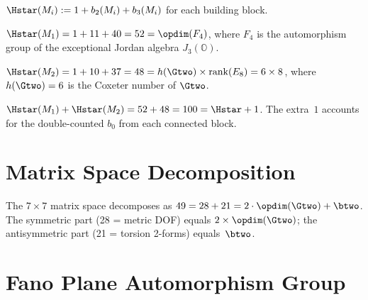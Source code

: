 \begin{definition}[$\Hstar(M_i)$]\label{def:H_star_blocks}
    \leanok
    $\Hstar(M_i) := 1 + b_2(M_i) + b_3(M_i)$ for each building block.
\end{definition}

\begin{theorem}[$\Hstar(M_1) = \opdim(F_4)$]\label{thm:H_star_M1_F4}
    \leanok
    $\Hstar(M_1) = 1 + 11 + 40 = 52 = \opdim(F_4)$, where $F_4$ is
    the automorphism group of the exceptional Jordan algebra $J_3(\mathbb{O})$.
\end{theorem}

\begin{theorem}[$\Hstar(M_2) = h(\Gtwo) \times \mathrm{rank}(E_8)$]\label{thm:H_star_M2_coxeter}
    \leanok
    $\Hstar(M_2) = 1 + 10 + 37 = 48 = h(\Gtwo) \times \mathrm{rank}(E_8) = 6 \times 8$,
    where $h(\Gtwo) = 6$ is the Coxeter number of $\Gtwo$.
\end{theorem}

\begin{theorem}\label{thm:H_star_blocks_sum}
    \leanok
    $\Hstar(M_1) + \Hstar(M_2) = 52 + 48 = 100 = \Hstar + 1$.
    The extra~$1$ accounts for the double-counted $b_0$ from each connected block.
\end{theorem}

\section{Matrix Space Decomposition}

\begin{theorem}[$\opdim(K_7)^2 = 2 \cdot \opdim(\Gtwo) + \btwo$]\label{thm:matrix_decomp}
    \leanok
    The $7 \times 7$ matrix space decomposes as
    $49 = 28 + 21 = 2 \cdot \opdim(\Gtwo) + \btwo$.
    The symmetric part (28 = metric DOF) equals $2 \times \opdim(\Gtwo)$;
    the antisymmetric part (21 = torsion 2-forms) equals~$\btwo$.
\end{theorem}

\section{Fano Plane Automorphism Group}

